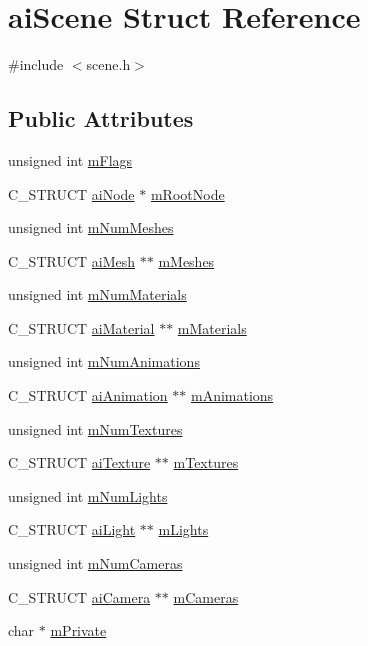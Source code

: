 \hypertarget{structaiScene}{\section{ai\-Scene \-Struct \-Reference}
\label{structaiScene}
}


{\ttfamily \#include $<$scene.\-h$>$}

\subsection*{\-Public \-Attributes}
\begin{DoxyCompactItemize}
\item 
unsigned int \hyperlink{structaiScene_a4091f10bb81e05db00ebc34f40c48f38}{m\-Flags}
\item 
\-C\-\_\-\-S\-T\-R\-U\-C\-T \hyperlink{structaiNode}{ai\-Node} $\ast$ \hyperlink{structaiScene_ad0e9a7e68f2ed6b3120a7c19ef20307a}{m\-Root\-Node}
\item 
unsigned int \hyperlink{structaiScene_a1a6c1abca994c54381a28cc151e5fa4f}{m\-Num\-Meshes}
\item 
\-C\-\_\-\-S\-T\-R\-U\-C\-T \hyperlink{structaiMesh}{ai\-Mesh} $\ast$$\ast$ \hyperlink{structaiScene_ad1c7000f0f28ea747868db9f94d32a3d}{m\-Meshes}
\item 
unsigned int \hyperlink{structaiScene_a4277d8bffe8b8f568098af6c31d042b7}{m\-Num\-Materials}
\item 
\-C\-\_\-\-S\-T\-R\-U\-C\-T \hyperlink{structaiMaterial}{ai\-Material} $\ast$$\ast$ \hyperlink{structaiScene_a52bc7089a5b943ad7c7c386e616df35e}{m\-Materials}
\item 
unsigned int \hyperlink{structaiScene_aa2af030ec218ead0dc062b6a96a7471a}{m\-Num\-Animations}
\item 
\-C\-\_\-\-S\-T\-R\-U\-C\-T \hyperlink{structaiAnimation}{ai\-Animation} $\ast$$\ast$ \hyperlink{structaiScene_ab76fb8f38c2e7365ccce42d565b62b25}{m\-Animations}
\item 
unsigned int \hyperlink{structaiScene_a0d61a5439edd7223097b48aea57c47dd}{m\-Num\-Textures}
\item 
\-C\-\_\-\-S\-T\-R\-U\-C\-T \hyperlink{structaiTexture}{ai\-Texture} $\ast$$\ast$ \hyperlink{structaiScene_a0fd0d29fbc439e3715b4975ccb68d2d3}{m\-Textures}
\item 
unsigned int \hyperlink{structaiScene_a0c90fc5f15b979e0bb0d3e8f1e246307}{m\-Num\-Lights}
\item 
\-C\-\_\-\-S\-T\-R\-U\-C\-T \hyperlink{structaiLight}{ai\-Light} $\ast$$\ast$ \hyperlink{structaiScene_a2e64a69ade81cae0b3901bea90b6bb47}{m\-Lights}
\item 
unsigned int \hyperlink{structaiScene_a4abc432e1b22a7e01553f33c79c0592f}{m\-Num\-Cameras}
\item 
\-C\-\_\-\-S\-T\-R\-U\-C\-T \hyperlink{structaiCamera}{ai\-Camera} $\ast$$\ast$ \hyperlink{structaiScene_a71e7d204d96969ca4f5a931f4d636f1e}{m\-Cameras}
\item 
char $\ast$ \hyperlink{structaiScene_adc5fcf5c4ef86a45f721560d6c1a4923}{m\-Private}
\end{DoxyCompactItemize}


